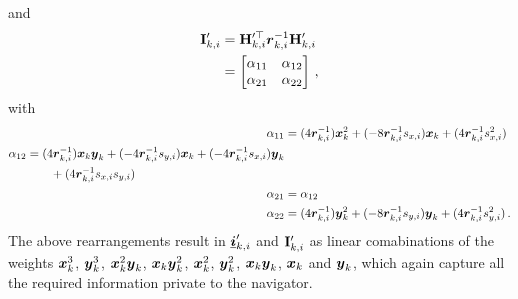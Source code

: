 \documentclass[twocolumn]{autart}
\begin{document}
and
\begin{equation}
    \begin{split}
        {\ensuremath{{\mathbf{I}}}}'_{k,i} &= {{\mathbf{H}}}_{k,i}^{\prime\top} {\boldsymbol{r}}_{k,i}^{-1}{{\mathbf{H}}}'_{k,i} \\
        &=
        \begin{bmatrix}
            \alpha_{11} & \alpha_{12} \\
            \alpha_{21} & \alpha_{22}
        \end{bmatrix}\,,
    \end{split} \label{eqn:hrh_linear_comb}
\end{equation}
with
\begin{align*}
    \alpha_{11} &= (4{\boldsymbol{r}}_{k,i}^{-1}){\boldsymbol{x}}_k^2 + (-8{\boldsymbol{r}}_{k,i}^{-1}s_{x,i}){\boldsymbol{x}}_k + (4{\boldsymbol{r}}_{k,i}^{-1}s_{x,i}^2) \\
    \begin{split}
        \alpha_{12} &= (4{\boldsymbol{r}}_{k,i}^{-1}){\boldsymbol{x}}_k{\boldsymbol{y}}_k + (-4{\boldsymbol{r}}_{k,i}^{-1}s_{y,i}){\boldsymbol{x}}_k + (-4{\boldsymbol{r}}_{k,i}^{-1}s_{x,i}){\boldsymbol{y}}_k \\
        &\qquad+ (4{\boldsymbol{r}}_{k,i}^{-1}s_{x,i}s_{y,i})
    \end{split}\\
    \alpha_{21} &= \alpha_{12} \\
    \alpha_{22} &= (4{\boldsymbol{r}}_{k,i}^{-1}){\boldsymbol{y}}_k^2 + (-8{\boldsymbol{r}}_{k,i}^{-1}s_{y,i}){\boldsymbol{y}}_k + (4{\boldsymbol{r}}_{k,i}^{-1}s_{y,i}^2)\,.
\end{align*}
The above rearrangements result in ${\boldsymbol{\underline{i}}}'_{k,i}$ and ${{\mathbf{I}}}'_{k,i}$ as linear comabinations of the weights ${\boldsymbol{x}}_k^3$, ${\boldsymbol{y}}_k^3$, ${\boldsymbol{x}}_k^2{\boldsymbol{y}}_k$, ${\boldsymbol{x}}_k{\boldsymbol{y}}_k^2$, ${\boldsymbol{x}}_k^2$, ${\boldsymbol{y}}_k^2$, ${\boldsymbol{x}}_k{\boldsymbol{y}}_k$, ${\boldsymbol{x}}_k$ and ${\boldsymbol{y}}_k$, which again capture all the required information private to the navigator.
\end{document}
